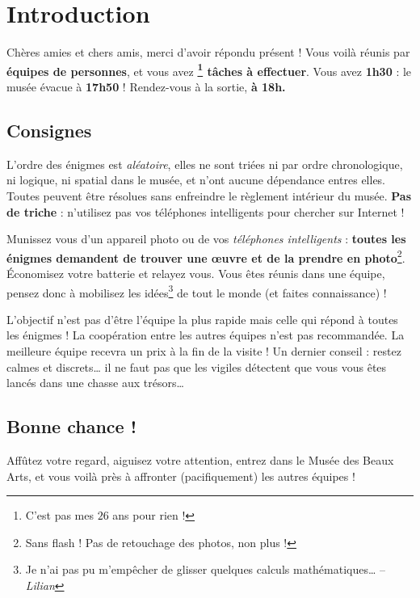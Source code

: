 \chapter{Introduction}

\vspace*{-30pt}

Chères amies et chers amis, merci d'avoir répondu présent !
%
Vous voilà réunis par \textbf{équipes de \intervalparequipe{} personnes},
et vous avez \textbf{\nbenigmes{}\footnote{C'est pas mes $26$ ans pour rien !} tâches à effectuer}.
%
Vous avez \textbf{1h30} : le musée évacue à \textbf{17h50} !
%
Rendez-vous à la sortie, \textbf{à 18h.}


\section*{Consignes}

L'ordre des énigmes est \emph{aléatoire}, elles ne sont triées ni par ordre chronologique, ni logique, ni spatial dans le musée, et n'ont aucune dépendance entres elles.
%
Toutes peuvent être résolues sans enfreindre le règlement intérieur du musée.
\textbf{Pas de triche} : n'utilisez pas vos téléphones intelligents pour chercher sur Internet !

Munissez vous d'un appareil photo ou de vos \emph{téléphones intelligents} : \textbf{toutes les énigmes demandent de trouver une œuvre et de la prendre en photo}\footnote{Sans flash ! Pas de retouchage des photos, non plus !}.
Économisez votre batterie et relayez vous.
%
Vous êtes réunis dans une équipe, pensez donc à mobilisez les idées\footnote{Je n'ai pas pu m'empêcher de glisser quelques calculs mathématiques… -- \emph{Lilian}} de tout le monde (et faites connaissance) !

L'objectif n'est pas d'être l'équipe la plus rapide mais celle qui répond à toutes les énigmes !
La coopération entre les autres équipes n'est pas recommandée.
La meilleure équipe recevra un prix à la fin de la visite !
%
Un dernier conseil : restez calmes et discrets… il ne faut pas que les vigiles détectent que vous vous êtes lancés dans une chasse aux trésors…


\section*{Bonne chance !}
Affûtez votre regard, aiguisez votre attention, entrez dans le Musée des Beaux Arts, et vous voilà près à affronter (pacifiquement) les autres équipes !
